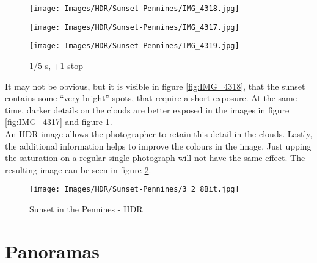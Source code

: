 \begin{figure}[htb]
\begin{minipage}{.32\textwidth}
	\centering
		\texttt{[image: Images/HDR/Sunset-Pennines/IMG\_4318.jpg]}
	\caption{1/20 s, -1 stop}
	\label{fig:IMG_4318}
\end{minipage}
\begin{minipage}{.32\textwidth}
	\centering
		\texttt{[image: Images/HDR/Sunset-Pennines/IMG\_4317.jpg]}
	\caption{1/10 s}
	\label{fig:IMG_4317}
\end{minipage}
\begin{minipage}{.32\textwidth}
	\centering
		\texttt{[image: Images/HDR/Sunset-Pennines/IMG\_4319.jpg]}
	\caption{1/5 s, +1 stop}
	\label{fig:IMG_4319}
\end{minipage}
\end{figure}

It may not be obvious, but it is visible in figure \ref{fig:IMG_4318}, that the sunset contains some ``very bright'' spots, that require a short \gls{exposure}. At the same time, darker details on the clouds are better exposed in the images in figure \ref{fig:IMG_4317} and figure \ref{fig:IMG_4319}.
\\
An \gls{HDR} image allows the photographer to retain this detail in the clouds. Lastly, the additional information helps to improve the colours in the image. Just upping the saturation on a regular single photograph will not have the same effect. The resulting image can be seen in figure \ref{fig:3_2_8Bit}.

\begin{figure}
	\centering
		\texttt{[image: Images/HDR/Sunset-Pennines/3\_2\_8Bit.jpg]}
	\caption{Sunset in the Pennines - HDR}
	\label{fig:3_2_8Bit}
\end{figure}

\section{Panoramas}
\label{sec:Photomerge}


